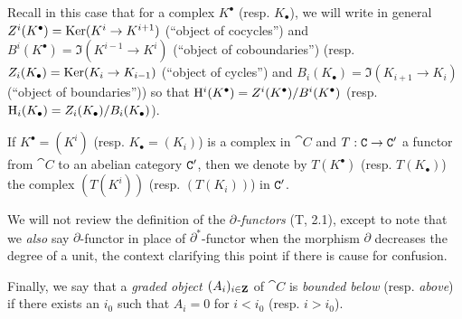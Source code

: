 \begin{env}[11.2.1]
Recall in this case that for a complex $K^\bullet$ (resp. $K_\bullet$), we will write in general $Z^i(K^\bullet)=\Ker(K^i\to K^{i+1})$ (``object of cocycles'') and $B^i(K^\bullet)=\Im(K^{i-1}\to K^i)$ (``object of coboundaries'') (resp. $Z_i(K_\bullet)=\Ker(K_i\to K_{i-1})$ (``object of cycles'') and $B_i(K_\bullet)=\Im(K_{i+1}\to K_i)$ (``object of boundaries'')) so that $\mathrm{H}^i(K^\bullet)=Z^i(K^\bullet)/B^i(K^\bullet)$ (resp. $\mathrm{H}_i(K_\bullet)=Z_i(K_\bullet)/B_i(K_\bullet)$).

If $K^\bullet=(K^i)$ (resp. $K_\bullet=(K_i)$) is a complex in $\cat{C}$ and $T:\C\to\C'$ a functor from $\cat{C}$ to an abelian category $\mathtt{C}'$, then we denote by $T(K^\bullet)$ (resp. $T(K_\bullet)$) the complex $(T(K^i))$ (resp. $(T(K_i))$) in $\mathtt{C}'$.

We will not review the definition of the \emph{$\partial$-functors} (T, 2.1), except to note that we \emph{also} say $\partial$-functor in place of $\partial^*$-functor when the morphism $\partial$ decreases the degree of a unit, the context clarifying this point if there is cause for confusion.

Finally, we say that a \emph{graded object $(A_i)_{i\in\mathbf{Z}}$} of $\cat{C}$ is \emph{bounded below} (resp. \emph{above}) if there exists an $i_0$ such that $A_i=0$ for $i<i_0$ (resp. $i>i_0$).
\end{env}

